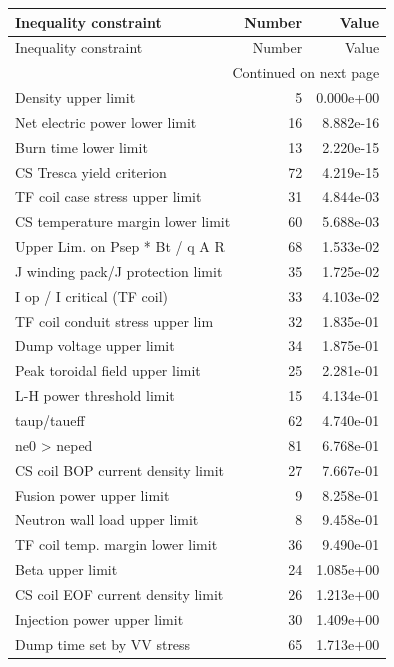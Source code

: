\begin{longtable}{lrr}
\toprule
Inequality constraint & Number & Value \\
\midrule
\endfirsthead
\toprule
Inequality constraint & Number & Value \\
\midrule
\endhead
\midrule
\multicolumn{3}{r}{Continued on next page} \\
\midrule
\endfoot
\bottomrule
\endlastfoot
Density upper limit & 5 & 0.000e+00 \\
Net electric power lower limit & 16 & 8.882e-16 \\
Burn time lower limit & 13 & 2.220e-15 \\
CS Tresca yield criterion & 72 & 4.219e-15 \\
TF coil case stress upper limit & 31 & 4.844e-03 \\
CS temperature margin lower limit & 60 & 5.688e-03 \\
Upper Lim. on Psep * Bt / q A R & 68 & 1.533e-02 \\
J winding pack/J protection limit & 35 & 1.725e-02 \\
I op / I critical (TF coil) & 33 & 4.103e-02 \\
TF coil conduit stress upper lim & 32 & 1.835e-01 \\
Dump voltage upper limit & 34 & 1.875e-01 \\
Peak toroidal field upper limit & 25 & 2.281e-01 \\
L-H power threshold limit & 15 & 4.134e-01 \\
taup/taueff & 62 & 4.740e-01 \\
ne0 > neped & 81 & 6.768e-01 \\
CS coil BOP current density limit & 27 & 7.667e-01 \\
Fusion power upper limit & 9 & 8.258e-01 \\
Neutron wall load upper limit & 8 & 9.458e-01 \\
TF coil temp. margin lower limit & 36 & 9.490e-01 \\
Beta upper limit & 24 & 1.085e+00 \\
CS coil EOF current density limit & 26 & 1.213e+00 \\
Injection power upper limit & 30 & 1.409e+00 \\
Dump time set by VV stress & 65 & 1.713e+00 \\
\end{longtable}
